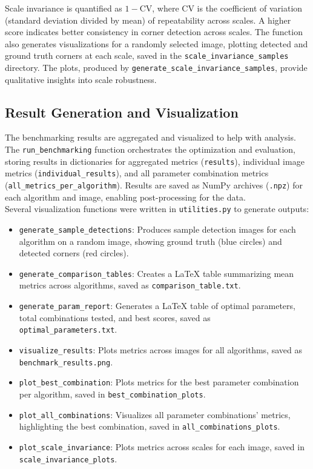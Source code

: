 \documentclass[journal]{IEEEtran}
\begin{document}
Scale invariance is quantified as \( 1 - \text{CV} \), where CV is the coefficient of variation (standard deviation divided by mean) of repeatability across scales. A higher score indicates better consistency in corner detection across scales. The function also generates visualizations for a randomly selected image, plotting detected and ground truth corners at each scale, saved in the \texttt{scale\_invariance\_samples} directory. The plots, produced by \texttt{generate\_scale\_invariance\_samples}, provide qualitative insights into scale robustness.\\

\subsection{Result Generation and Visualization}
The benchmarking results are aggregated and visualized to help with analysis. The \texttt{run\_benchmarking} function orchestrates the optimization and evaluation, storing results in dictionaries for aggregated metrics (\texttt{results}), individual image metrics (\texttt{individual\_results}), and all parameter combination metrics (\texttt{all\_metrics\_per\_algorithm}). Results are saved as NumPy archives (\texttt{.npz}) for each algorithm and image, enabling post-processing for the data.\\

Several visualization functions were written in \texttt{utilities.py} to generate outputs:
\begin{itemize}
    \item \texttt{generate\_sample\_detections}: Produces sample detection images for each algorithm on a random image, showing ground truth (blue circles) and detected corners (red circles).
    \item \texttt{generate\_comparison\_tables}: Creates a LaTeX table summarizing mean metrics across algorithms, saved as \texttt{comparison\_table.txt}.
    \item \texttt{generate\_param\_report}: Generates a LaTeX table of optimal parameters, total combinations tested, and best scores, saved as \texttt{optimal\_parameters.txt}.
    \item \texttt{visualize\_results}: Plots metrics across images for all algorithms, saved as \texttt{benchmark\_results.png}.
    \item \texttt{plot\_best\_combination}: Plots metrics for the best parameter combination per algorithm, saved in \texttt{best\_combination\_plots}.
    \item \texttt{plot\_all\_combinations}: Visualizes all parameter combinations’ metrics, highlighting the best combination, saved in \texttt{all\_combinations\_plots}.
    \item \texttt{plot\_scale\_invariance}: Plots metrics across scales for each image, saved in \texttt{scale\_invariance\_plots}.
\end{itemize}
\end{document}
